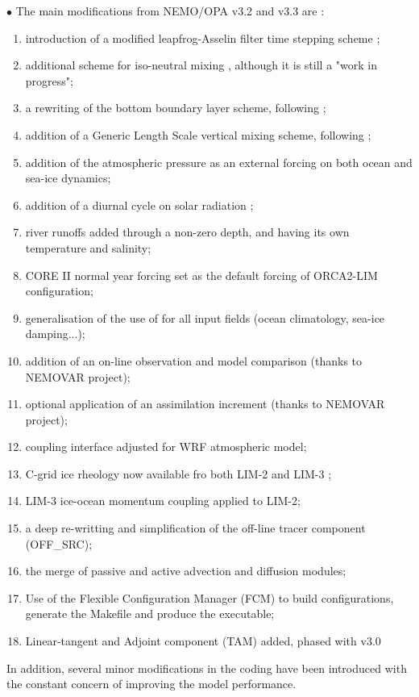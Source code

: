 \documentclass[../tex_main/NEMO_manual]{subfiles}
\begin{document}
 \vspace{1cm}
$\bullet$ The main modifications from NEMO/OPA v3.2 and v3.3 are :\\
\begin{enumerate}
\item
  introduction of a modified leapfrog-Asselin filter time stepping scheme
  \citep{Leclair_Madec_OM09}; 
\item
  additional scheme for iso-neutral mixing \citep{Griffies_al_JPO98}, although it is still a "work in progress";
\item
  a rewriting of the bottom boundary layer scheme, following \citet{Campin_Goosse_Tel99};
\item
  addition of a Generic Length Scale vertical mixing scheme, following \citet{Umlauf_Burchard_JMS03};
\item
  addition of the atmospheric pressure as an external forcing on both ocean and sea-ice dynamics;
\item
  addition of a diurnal cycle on solar radiation \citep{Bernie_al_CD07};
\item
  river runoffs added through a non-zero depth, and having its own temperature and salinity;
\item
  CORE II normal year forcing set as the default forcing of ORCA2-LIM configuration;
\item
  generalisation of the use of  for all input fields (ocean climatology, sea-ice damping...);
\item
  addition of an on-line observation and model comparison (thanks to NEMOVAR project);
\item
  optional application of an assimilation increment (thanks to NEMOVAR project);
\item
  coupling interface adjusted for WRF atmospheric model;
\item
  C-grid ice rheology now available fro both LIM-2 and LIM-3 \citep{Bouillon_al_OM09};
\item
  LIM-3 ice-ocean momentum coupling applied to LIM-2;
\item
  a deep re-writting and simplification of the off-line tracer component (OFF\_SRC);
\item
  the merge of passive and active advection and diffusion modules;
\item
  Use of the Flexible Configuration Manager (FCM) to build configurations,
  generate the Makefile and produce the executable;
\item
  Linear-tangent and Adjoint component (TAM) added, phased with v3.0
\end{enumerate}
\vspace{1cm}
In addition, several minor modifications in the coding have been introduced with the constant concern of
improving the model performance. 
\end{document}
